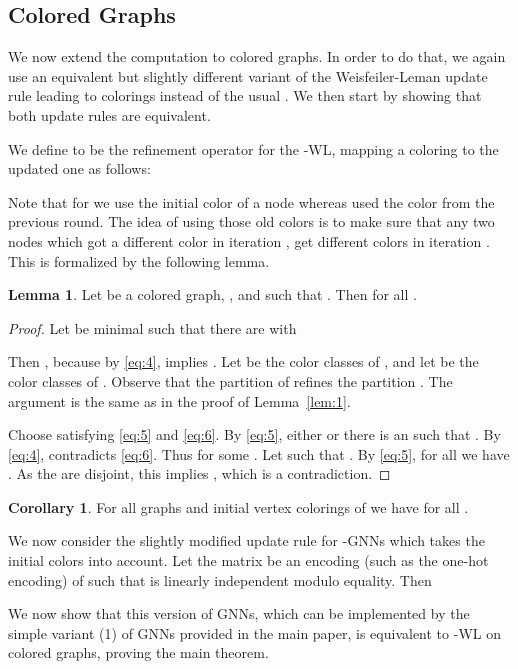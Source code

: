 \documentclass[letterpaper]{article}
\theoremstyle{definition}
\newtheorem{lemma}[theorem]{Lemma}
\newtheorem{corollary}[theorem]{Corollary}
\begin{document}
\subsection{Colored Graphs}
We now extend the computation to colored graphs.
In order to do that, we again use an equivalent but slightly different variant of the Weisfeiler-Leman update rule leading to colorings  instead of the usual . 
We then start by showing that both update rules are equivalent.

We define  to be the refinement operator for the -WL, mapping a coloring  to the updated one  as follows:

Note that for  we use the initial color  of a node  whereas  used the color  from the previous round.
The idea of using those old colors is to make sure that any two nodes which got a different color in iteration , get different colors in iteration .
This is formalized by the following lemma.

\begin{lemma}\label{lem:2}
	Let  be a colored graph, , and  such that
	. 
	Then  for all .
\end{lemma}

\begin{proof}
	Let  be minimal such that there are  with
	
	Then , because by \eqref{eq:4},
	 implies . Let  be the color classes of , and let  be the color classes of . 
	Observe that the partition  of  refines the partition
	. The argument is the same as in the proof of
	Lemma~\ref{lem:1}.
		
	Choose  satisfying \eqref{eq:5} and \eqref{eq:6}. 
	By \eqref{eq:5}, either  or there is an  such that . 
	By \eqref{eq:4},  contradicts \eqref{eq:6}. 
	Thus  for some . 
	Let  such that . By \eqref{eq:5}, for all  we have . 
	As the  are disjoint, this implies , which is a contradiction.
\end{proof}
\begin{corollary}\label{cor:c-l-zero}
	For all graphs  and initial vertex colorings  of  we have
	 for all .
\end{corollary}
We now consider the slightly modified update rule for -GNNs which takes the initial colors  into account.
Let the matrix  be an encoding (such as the one-hot encoding) of  such that  is linearly independent modulo equality. Then



We now show that this version of GNNs, which can be implemented by the simple variant (1) of GNNs provided in the main paper, is equivalent to -WL on colored graphs, proving the main theorem.
\end{document}
